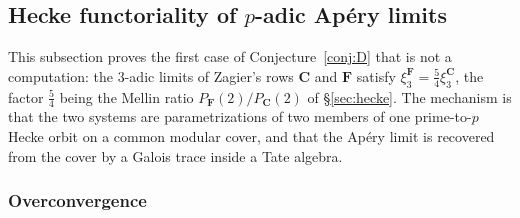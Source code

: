 
\subsection{Hecke functoriality of $p$-adic Ap\'ery limits}
\label{sec:rigiditytransfer}

This subsection proves the first case of Conjecture~\ref{conj:D} that is not a
computation: the $3$-adic limits of Zagier's rows $\mathbf C$ and $\mathbf F$
satisfy $\xi_3^{\mathbf F}=\tfrac54\xi_3^{\mathbf C}$, the factor $\tfrac54$ being
the Mellin ratio $P_{\mathbf F}(2)/P_{\mathbf C}(2)$ of \S\ref{sec:hecke}.  The
mechanism is that the two systems are parametrizations of two members of one
prime-to-$p$ Hecke orbit on a common modular cover, and that the Ap\'ery limit is
recovered from the cover by a Galois trace inside a Tate algebra.

\subsubsection*{Overconvergence}

